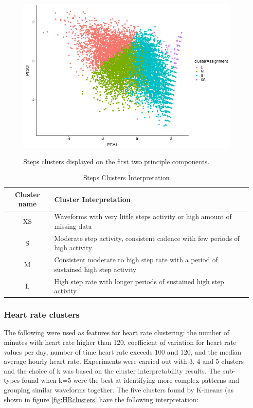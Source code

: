 \documentclass{article}
\begin{document}
\begin{figure}[htb]
  \centering
  \caption{Steps clusters displayed on the first two principle components.}
  \includegraphics[]{stepsClusters.png}
  \label{fig:stepsClusters}
\end{figure}

\begin{table}[H]
  \caption{Steps Clusters Interpretation}
  \label{steps_inter}
  \centering
  \begin{tabular}{ c|l }
    \toprule
    \cmidrule(r){1-2}
    Cluster name & Cluster Interpretation \\
    \midrule
    XS & Waveforms with very little steps activity or high amount of missing data \\
    \midrule
    S & Moderate step activity, consistent cadence with few periods of high activity\\
    \midrule
    M & Consistent moderate to high step rate with a period of sustained high step activity \\
    \midrule
    L & High step rate with longer periods of sustained high step activity \\
    \bottomrule
    \end{tabular}
\end{table}

\subsubsection{Heart rate clusters}

The following were used as features for heart rate clustering: the number of minutes with heart rate higher than 120, coefficient of variation for heart rate values per day, number of time heart rate exceeds 100 and 120, and the median average hourly heart rate. Experiments were carried out with 3, 4 and 5 clusters and the choice of k was based on the cluster interpretability results. The sub-types found when k=5 were the best at identifying more complex patterns and grouping similar waveforms together. 
The five clusters found by K-means (as shown in figure \ref{fig:HRclusters} have the following interpretation: 
\end{document}
